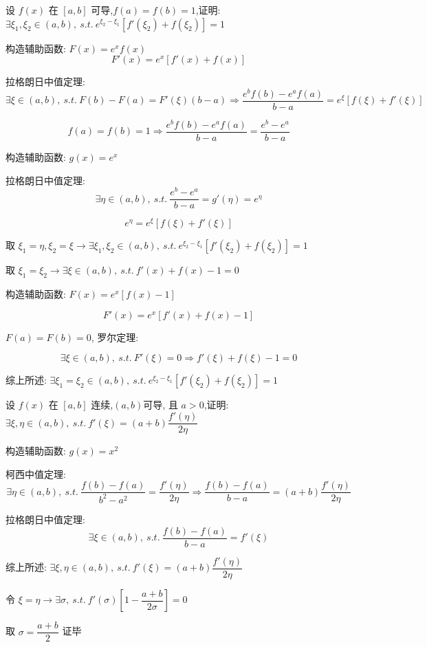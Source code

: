 \begin{proposition}
	设 $f(x)$ 在 $[a,b]$ 可导,$f(a)=f(b)=1$,证明: $\exists \xi_{1},\xi_{2}\in(a,b),\ s.t.\ e^{\xi_{2}-\xi_{1}}[f'(\xi_{2})+f(\xi_{2})]=1$
\end{proposition}
\begin{solution}

	构造辅助函数: $F(x)=e^xf(x)$
	$$F'(x)=e^x[f'(x)+f(x)]$$

	拉格朗日中值定理:
	$$\exists\xi\in(a,b),\ s.t.\ F(b)-F(a)=F'(\xi)(b-a)\Rightarrow \dfrac{e^bf(b)-e^af(a)}{b-a}=e^{\xi}[f(\xi)+f'(\xi)]$$

	$$f(a)=f(b)=1\Rightarrow \dfrac{e^bf(b)-e^af(a)}{b-a}=\dfrac{e^b-e^a}{b-a}$$

	构造辅助函数: $g(x)=e^x$

	拉格朗日中值定理:
	$$\exists\eta\in(a,b),\ s.t.\ \dfrac{e^b-e^a}{b-a}=g'(\eta)=e^{\eta}$$

	$$e^{\eta}=e^{\xi}[f(\xi)+f'(\xi)]$$

	取 $\xi_{1}=\eta,\xi_{2}=\xi\to \exists \xi_{1},\xi_{2}\in(a,b),\ s.t.\ e^{\xi_{2}-\xi_{1}}[f'(\xi_{2})+f(\xi_{2})]=1$
\end{solution}
\begin{anymark}[注]
	取 $\xi_{1}=\xi_{2}\to \exists\xi\in(a,b),\ s.t.\ f'(x)+f(x)-1=0$

	构造辅助函数: $F(x)=e^x[f(x)-1]$

	$$F'(x)=e^{x}[f'(x)+f(x)-1]$$

	$F(a) = F(b) = 0$, 罗尔定理:

	$$\exists\xi\in(a,b),\ s.t.\ F'(\xi)=0\Rightarrow f'(\xi)+f(\xi)-1=0$$

	综上所述: $\exists \xi_{1}=\xi_{2}\in(a,b),\ s.t.\ e^{\xi_{2}-\xi_{1}}[f'(\xi_{2})+f(\xi_{2})]=1$
\end{anymark}

\begin{proposition}
	设 $f(x)$ 在 $[a,b]$ 连续,$(a,b)$可导, 且 $a>0$,证明: $\exists \xi,\eta\in(a,b),\ s.t.\ f'(\xi)=(a+b)\dfrac{f'(\eta)}{2\eta}$
\end{proposition}
\begin{solution}

	构造辅助函数: $g(x)=x^2$

	柯西中值定理:
	$$\exists\eta\in(a,b),\ s.t.\ \dfrac{f(b)-f(a)}{b^2-a^2}=\dfrac{f'(\eta)}{2\eta}\Rightarrow \dfrac{f(b)-f(a)}{b-a}=(a+b)\dfrac{f'(\eta)}{2\eta}$$

	拉格朗日中值定理:
	$$\exists\xi\in(a,b),\ s.t.\ \dfrac{f(b)-f(a)}{b-a}=f'(\xi)$$

	综上所述: $\exists \xi,\eta\in(a,b),\ s.t.\ f'(\xi)=(a+b)\dfrac{f'(\eta)}{2\eta}$
\end{solution}
\begin{anymark}[注]
	令 $\xi=\eta\to \exists \sigma,\ s.t.\ f'(\sigma)[1-\dfrac{a+b}{2\sigma}]=0$

	取 $\sigma=\dfrac{a+b}{2}$ 证毕
\end{anymark}

